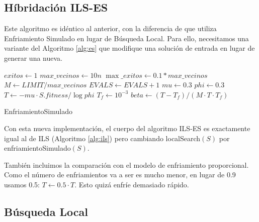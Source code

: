 \documentclass{article}
\begin{document}
\subsection{Híbridación ILS-ES}

Este algoritmo es idéntico al anterior, con la diferencia de que utiliza Enfriamiento Simulado en lugar de Búsqueda Local.
Para ello, necesitamos una variante del Algoritmo \ref{alg:es} que modifique una solución de entrada en lugar de generar una
nueva.

\begin{algorithm}[H]
	\DontPrintSemicolon %
	$exitos\gets 1$ 
	$max\_vecinos\gets 10n$\;
	$\max\_exitos\gets 0.1*max\_vecinos$\;
	$M\gets LIMIT/max\_vecinos$\;
	$EVALS\gets EVALS+1$\;
	$mu\gets 0.3$\;
	$phi\gets 0.3$\;
	$T\gets -mu\cdot S.fitness/\log phi$ 
	$T_f\gets 10^{-3}$\;
	$beta\gets (T-T_f)/(M\cdot T\cdot T_f)$\;
	\;
	\caption{{\sc EnfriamientoSimulado}}
	\label{alg:es-ils}
\end{algorithm}

Con esta nueva implementación, el cuerpo del algoritmo ILS-ES es exactamente igual al de ILS (Algoritmo \ref{alg:ils}) pero
cambiando localSearch$(S)$ por enfriamientoSimulado$(S)$.

También incluimos la comparación con el modelo de enfriamiento proporcional. Como el número de enfriamientos va a ser es mucho menor,
en lugar de 0.9 usamos 0.5: $T\gets 0.5\cdot T$. Esto quizá enfríe demasiado rápido.

\subsection{Búsqueda Local}
\end{document}
